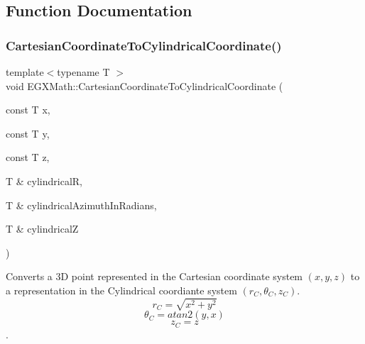 \subsection{Function Documentation}
\mbox{\label{group___e_g_x_math-_conversions-_coordinate_conversions-3_d-_cartesian_ga50f1cbdafbe435b13e34c7a3a6ccedc6}} 
\subsubsection{\texorpdfstring{Cartesian\+Coordinate\+To\+Cylindrical\+Coordinate()}{CartesianCoordinateToCylindricalCoordinate()}}
{\footnotesize\ttfamily template$<$typename T $>$ \\
void E\+G\+X\+Math\+::\+Cartesian\+Coordinate\+To\+Cylindrical\+Coordinate (\begin{DoxyParamCaption}\item[{const T}]{x,  }\item[{const T}]{y,  }\item[{const T}]{z,  }\item[{T \&}]{cylindricalR,  }\item[{T \&}]{cylindrical\+Azimuth\+In\+Radians,  }\item[{T \&}]{cylindricalZ }\end{DoxyParamCaption})}



Converts a 3D point represented in the Cartesian coordinate system $(x,y,z)$ to a representation in the Cylindrical coordiante system $(r_C,\theta_C,z_C)$. \[ r_C = \sqrt{x^2+y^2} \] \[ \theta_C = atan2(y,x) \] \[ z_C = z \]. 

